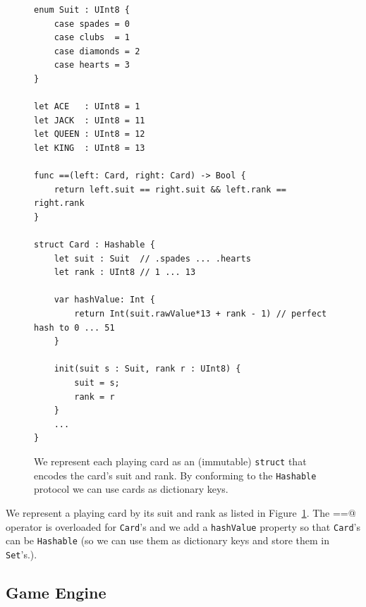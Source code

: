 \documentclass[11pt]{article}
\begin{document}
\begin{figure}[ht!]
\begin{center}
\begin{verbatim}
enum Suit : UInt8 {
    case spades = 0
    case clubs  = 1
    case diamonds = 2
    case hearts = 3
}

let ACE   : UInt8 = 1
let JACK  : UInt8 = 11
let QUEEN : UInt8 = 12
let KING  : UInt8 = 13

func ==(left: Card, right: Card) -> Bool {
    return left.suit == right.suit && left.rank == right.rank
}

struct Card : Hashable {
    let suit : Suit  // .spades ... .hearts
    let rank : UInt8 // 1 ... 13
    
    var hashValue: Int {
        return Int(suit.rawValue*13 + rank - 1) // perfect hash to 0 ... 51
    }
    
    init(suit s : Suit, rank r : UInt8) {
        suit = s;
        rank = r
    }
    ...
}
\end{verbatim}
\caption{We represent each playing card as an (immutable) {\tt struct} that encodes 
  the card's suit and rank. By conforming to the {\tt Hashable} protocol 
  we can use cards as dictionary keys.}
\label{fig:Card}
\end{center}
\end{figure}

We represent a playing card by its suit and rank as listed in Figure~\ref{fig:Card}.
The \verb@==@ operator is overloaded for {\tt Card}'s and we add a {\tt hashValue}
property so that {\tt Card}'s can be {\tt Hashable} (so we can use them as dictionary keys
and store them in {\tt Set}'s.).

\subsection{Game Engine}
\end{document}
